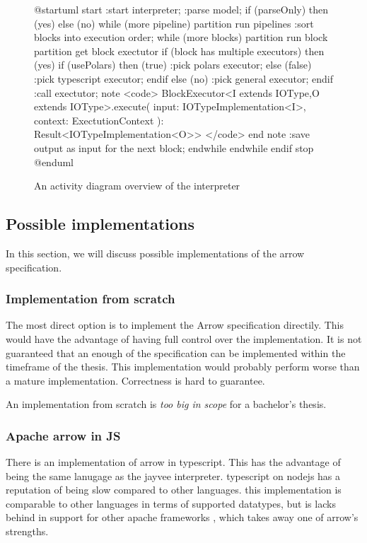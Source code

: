 \begin{figure}
	\begin{plantuml}
		@startuml
		start
		:start interpreter;
		:parse model;
		if (parseOnly) then (yes)
		else (no)
		while (more pipeline)
		partition run pipelines {
				:sort blocks into execution order;
				while (more blocks)
				partition run block {
						partition get block exectutor {
								if (block has multiple executors) then (yes)
								if (usePolars) then (true)
								:pick polars executor;
								else (false)
								:pick typescript executor;
								endif
								else (no)
								:pick general executor;
								endif
							}
						:call exectutor;
						note
						<code>
						BlockExecutor<I extends IOType,O extends IOType>.execute(
						input: IOTypeImplementation<I>,
						context: ExectutionContext
						): Result<IOTypeImplementation<O>>
						</code>
						end note
						:save output as input for the next block;
					}
				endwhile
			}
		endwhile
		endif
		stop
		@enduml
	\end{plantuml}
	\caption{An activity diagram overview of the interpreter}
	\label{fig:interpreter_activity}
\end{figure}


\subsection{Possible implementations}
\label{subsection:arrow implementations}

In this section, we will discuss possible implementations of the arrow specification.

\subsubsection{Implementation from scratch}
\label{subsubsection:direct_implementation}
The most direct option is to implement the Arrow specification directily.
This would have the advantage of having full control over the implementation.
It is not guaranteed that an enough of the specification can be implemented within the timeframe of the thesis.
This implementation would probably perform worse than a mature implementation.
Correctness is hard to guarantee.

An implementation from scratch is \emph{too big in scope} for a bachelor's thesis.

\subsubsection{Apache arrow in JS}
\label{subsubsection:arrow_in_js}
There is an implementation of arrow in typescript.
This has the advantage of being the same lanugage as the jayvee interpreter.
typescript on nodejs has a reputation of being slow compared to other languages. %
this implementation is comparable to other languages in terms of supported datatypes, but is lacks behind in support for other apache frameworks \autocite{arrow:status}, which takes away one of arrow's strengths.

